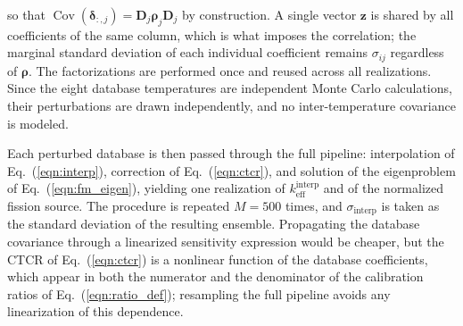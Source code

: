 \documentclass{style/nseJournal}
\begin{document}
so that $\operatorname{Cov}(\boldsymbol\delta_{:,j})=\mathbf{D}_j \boldsymbol\rho_j\mathbf{D}_j$ by construction. A single vector $\mathbf{z}$ is shared by all coefficients of the same column, which is what imposes the correlation; the marginal standard deviation of each individual coefficient remains $\sigma_{ij}$ regardless of $\boldsymbol\rho$. The factorizations are performed once and reused across all realizations. Since the eight database temperatures are independent Monte Carlo calculations, their perturbations are drawn independently, and no inter-temperature covariance is modeled.

Each perturbed database is then passed through the full pipeline: interpolation of Eq.~(\ref{eqn:interp}), correction of Eq.~(\ref{eqn:ctcr}), and solution of the eigenproblem of Eq.~(\ref{eqn:fm_eigen}), yielding one realization of $k_{\text{eff}}^{\text{interp}}$ and of the normalized fission source. The procedure is repeated $M=500$ times, and $\sigma_{\text{interp}}$ is taken as the standard deviation of the resulting ensemble. Propagating the database covariance through a linearized sensitivity expression would be cheaper, but the CTCR of Eq.~(\ref{eqn:ctcr}) is a nonlinear function of the database coefficients, which appear in both the numerator and the denominator of the calibration ratios of Eq.~(\ref{eqn:ratio_def}); resampling the full pipeline avoids any linearization of this dependence.
\end{document}
